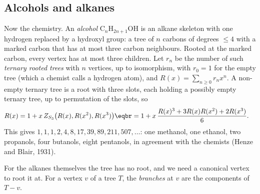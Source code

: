 \subsection*{Alcohols and alkanes}

Now the chemistry. An \emph{alcohol} $\mathrm C_n\mathrm H_{2n+1}\mathrm{OH}$ is an alkane skeleton with one hydrogen replaced by a hydroxyl group: a tree
of $n$ carbons of degrees $\le4$ with a marked carbon that has at most three carbon neighbours. Rooted at the marked carbon, every
vertex has at most three children. Let $r_n$ be the number of such \emph{ternary rooted trees} with $n$ vertices, up to isomorphism, with
$r_0=1$ for the empty tree (which a chemist calls a hydrogen atom), and $R(x)=\sum_{n\ge0}r_nx^n$. A non-empty ternary tree is a root with
three slots, each holding a possibly empty ternary tree, up to permutation of the slots, so
\[
\begin{aligned}{}&R(x)=1+x\,Z_{S_3}\big(R(x),R(x^2),R(x^3)\big)\eqbr=1+x\,\frac{R(x)^3+3R(x)R(x^2)+2R(x^3)}6 .\end{aligned}
\]
This gives $1,1,1,2,4,8,17,39,89,211,507,\dots$: one methanol, one ethanol, two propanols, four butanols, eight pentanols, in
agreement with the chemists (Henze and Blair, 1931).

For the alkanes themselves the tree has no root, and we need a canonical vertex to root it at. For a vertex $v$ of a tree $T$, the
\emph{branches} at $v$ are the components of $T-v$.


